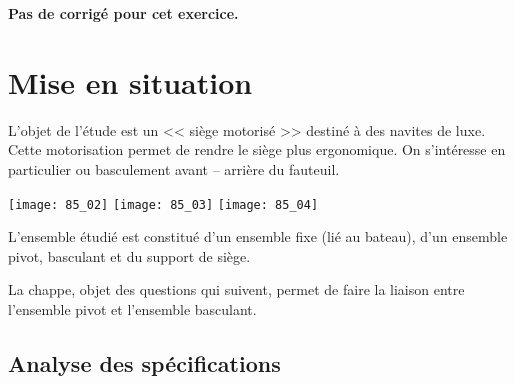 \normaltrue
\correctionfalse


\setcounter{numques}{0}



\ifcorrection
\else
\textbf{Pas de corrigé pour cet exercice.}
\fi

\section*{Mise en situation}
\ifprof
\else
\fi

L'objet de l'étude est un << siège motorisé >> destiné à des navites de luxe. Cette motorisation permet de rendre le siège plus ergonomique. On s'intéresse en particulier ou basculement avant -- arrière du fauteuil.

\begin{center}
\texttt{[image: 85\_02]}
\hspace{1cm}
\texttt{[image: 85\_03]}
\hspace{1cm}
\texttt{[image: 85\_04]}
\end{center}

L'ensemble étudié est constitué d'un ensemble fixe (lié au bateau), d'un ensemble pivot, basculant et du support de siège.

La chappe, objet des questions qui suivent, permet de faire la liaison entre l'ensemble pivot et l'ensemble basculant. 

\subsection*{Analyse des spécifications}






